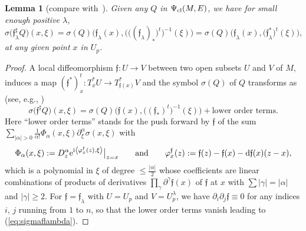 \documentclass[10pt,a4paper]{amsart}
\numberwithin{equation}{section}
\newtheorem{lem}[thm]{Lemma}
\theoremstyle{definition}
\begin{document}
\begin{lem}[{compare with~\cite[p.~381]{Sc}}]
Given any $Q$ in $\Psi_{\rm cl}(M,E)$,
 we have for small enough positive $\lambda$, 	
\begin{equation}\label{eq:sigmaflambda}
\sigma\bigl( {\mathfrak f}_{ \lambda}^\sharp Q\bigr)(x,\xi)
= 	\sigma(Q)\bigl( 	{\mathfrak f}_{ \lambda}(x),\bigl( \bigl( ({\mathfrak f}_{ \lambda})_*\bigr)^t\bigr)^{-1} (\xi)\bigr)
=\sigma ({ Q})\bigl({ { {\mathfrak f}}_{ \lambda}(x)}, \bigl({\mathfrak f}_{ \lambda}^*\bigr)^t (\xi)\bigr),
\end{equation}
at any given point $x$ in $U_p$.
\end{lem}
\begin{proof} A local diffeomorphism $\mathfrak{f}\colon U\to V$ between two open subsets $U$ and $V$ of $M$, induces a map $ ({\mathfrak f}^*)^t_x\colon T_x^*U\to T_{\mathfrak{f}(x)}^*V$ and the symbol $\sigma(Q)$ of $Q$ transforms as (see, e.g., \cite[equation~(4.2.1)]{Sh})
\begin{equation}\label{eq:sigmafsharp}
\sigma\bigl({\mathfrak{f}}^\sharp Q\bigr)(x, \xi)= \sigma(Q)\bigl(\mathfrak{f}(x), \bigl( ({\mathfrak f}_{ *})^t\bigr)^{-1}(\xi)\bigr)+ \text{lower order terms}.
\end{equation}
Here ``lower order terms'' stands for the push forward by $\mathfrak{f}$ of the sum  $\sum_{\vert \alpha\vert >0}
\frac{1}{\alpha!} \Phi_\alpha(x, \xi)
\partial_\xi^\alpha \sigma\left(x, \xi \right) $ with
\[
\Phi_\alpha (x, \xi):=
 D_z^\alpha {\rm e}^{{\rm i}\left\langle \varphi_x^\mathfrak{f}(z), \xi\right\rangle }\big\vert_{z=x} \qquad {\rm and}\qquad \varphi_x^\mathfrak{f}(z):=\mathfrak{f}(z)-\mathfrak{f}(x)-{\rm d}\mathfrak{f}(x)(z-x),
 \]
 which is a polynomial in $\xi$ of degree
 $\leq \frac{\vert \alpha\vert}{2}$
 whose coefficients are linear combinations of products of derivatives
 $ \prod_\gamma \partial^\gamma {\mathfrak f}(x)$ of $\mathfrak{f}$ at $x$ with $\sum\vert \gamma\vert=\vert\alpha\vert$ and $\vert\gamma\vert\geq 2$.
 For {$\mathfrak{f}=\mathfrak f_\lambda$ with $U=U_p$ and $V=U_p^\lambda$}, we have $\partial_i\partial_j \mathfrak{f}\equiv 0$ for any indices $i$, $j$ running from $1$ to $n$, so that the lower order terms vanish leading to (\ref{eq:sigmaflambda}).
 \end{proof}
\end{document}
